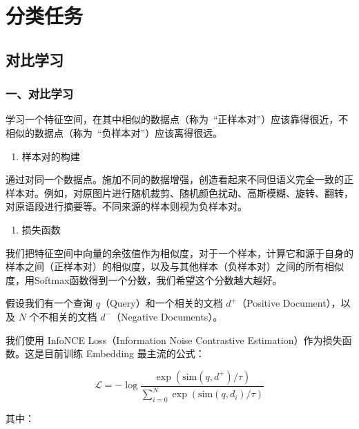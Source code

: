 \hypertarget{ux5206ux7c7bux4efbux52a1}{%
\chapter{分类任务}\label{ux5206ux7c7bux4efbux52a1}}

\hypertarget{ux5bf9ux6bd4ux5b66ux4e60}{%
\section{对比学习}\label{ux5bf9ux6bd4ux5b66ux4e60}}

\hypertarget{ux4e00ux5bf9ux6bd4ux5b66ux4e60}{%
\subsection{一、对比学习}\label{ux4e00ux5bf9ux6bd4ux5b66ux4e60}}

学习一个特征空间，在其中相似的数据点（称为~``正样本对''）应该靠得很近，不相似的数据点（称为~``负样本对''）应该离得很远。

\begin{enumerate}
\def\labelenumi{\arabic{enumi}.}
\tightlist
\item
  样本对的构建
\end{enumerate}

通过对同一个数据点。施加不同的数据增强，创造看起来不同但语义完全一致的正样本对。例如，对原图片进行随机裁剪、随机颜色扰动、高斯模糊、旋转、翻转，对原语段进行摘要等。不同来源的样本则视为负样本对。

\begin{enumerate}
\def\labelenumi{\arabic{enumi}.}
\setcounter{enumi}{1}
\tightlist
\item
  损失函数
\end{enumerate}

我们把特征空间中向量的余弦值作为相似度，对于一个样本，计算它和源于自身的样本之间（正样本对）的相似度，以及与其他样本（负样本对）之间的所有相似度，用Softmax函数得到一个分数，我们希望这个分数越大越好。

假设我们有一个查询 \(q\)（Query）和一个相关的文档 \(d^+\)（Positive Document），以及 \(N\) 个不相关的文档 \(d^-\)（Negative Documents）。

我们使用 InfoNCE Loss（Information Noise Contrastive Estimation）作为损失函数。这是目前训练 Embedding 最主流的公式：

\[
\mathcal{L} = -\log \frac{\exp(\mathrm{sim}(q,d^+)/\tau)}{\sum_{i=0}^{N}\exp(\mathrm{sim}(q,d_i)/\tau)}
\]

其中：

